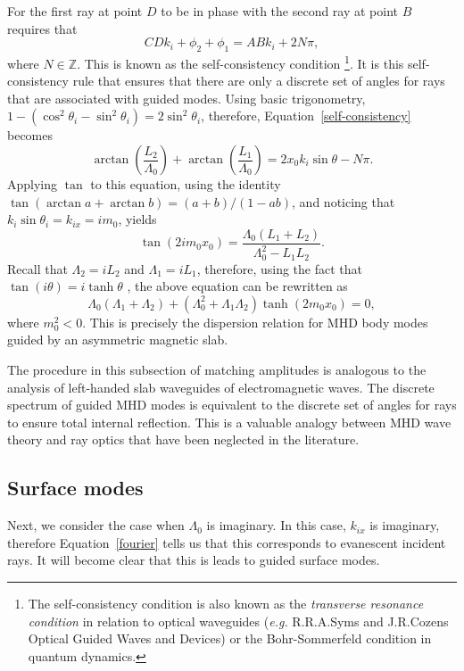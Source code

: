 \documentclass[12pt]{../style-files/ociamthesis}
\begin{document}
	For the first ray at point $D$ to be in phase with the second ray at point $B$ requires that
	\begin{equation}
	CD k_i  + \phi_2 + \phi_1 = AB k_i + 2N\pi, \label{self-consistency}
	\end{equation}
	where $N \in \mathbb{Z}$.
	This is known as the self-consistency condition \footnote{The self-consistency condition is also known as the \textit{transverse resonance condition} in relation to optical waveguides (\textit{e.g.} R.R.A.Syms and J.R.Cozens Optical Guided Waves and Devices) or the Bohr-Sommerfeld condition in quantum dynamics.}. It is this self-consistency rule that ensures that there are only a discrete set of angles for rays that are associated with guided modes. Using basic trigonometry, $1 - (\cos^2{\theta_i} - \sin^2{\theta_i}) = 2\sin^2{\theta_i}$, therefore, Equation~\eqref{self-consistency} becomes
	\begin{equation}
	\arctan\left(\frac{L_2}{\Lambda_0}\right) + \arctan\left(\frac{L_1}{\Lambda_0}\right) = 2x_0k_i \sin{\theta} - N\pi.
	\end{equation}
	Applying $\tan$ to this equation, using the identity $\tan(\arctan{a} + \arctan{b}) = (a + b) / (1 - ab)$, and noticing that $k_i\sin{\theta_i} = k_{ix} = im_0$, yields
	\begin{equation}
	\tan(2im_0x_0) = \frac{\Lambda_0 (L_1 + L_2)}{\Lambda_0^2 - L_1L_2}.
	\end{equation}
	Recall that $\Lambda_2 = iL_2$ and $\Lambda_1 = iL_1$, therefore, using the fact that $\tan(i\theta) = i\tanh{\theta}$ \citep{abr_etal65}, the above equation can be rewritten as
	\begin{equation}
	\Lambda_0 (\Lambda_1 + \Lambda_2) + (\Lambda_0^2 + \Lambda_1\Lambda_2)\tanh(2m_0x_0) = 0, \label{DR}
	\end{equation}
	where $m_0^2 < 0$. This is precisely the dispersion relation for MHD body modes guided by an asymmetric magnetic slab.
	
	The procedure in this subsection of matching amplitudes is analogous to the analysis of left-handed slab waveguides of electromagnetic waves. The discrete spectrum of guided MHD modes is equivalent to the discrete set of angles for rays to ensure total internal reflection. This is a valuable analogy between MHD wave theory and ray optics that have been neglected in the literature.
	
	
	\subsection{Surface modes}
	Next, we consider the case when $\Lambda_0$ is imaginary. In this case, $k_{ix}$ is imaginary, therefore Equation~\eqref{fourier} tells us that this corresponds to evanescent incident rays. It will become clear that this is leads to guided surface modes.
	
\end{document}
